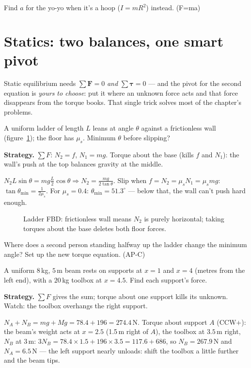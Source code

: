 \begin{exercise}[medium]
Find $a$ for the yo-yo when it's a hoop ($I=mR^{2}$) instead. (F=ma)
\end{exercise}

\section{Statics: two balances, one smart pivot}\label{sec:rot-static}

Static equilibrium needs $\sum\mathbf F=0$ \emph{and}
$\sum\boldsymbol\tau=0$ --- and the pivot for the second equation is
\emph{yours to choose}: put it where an unknown force acts and that force
disappears from the torque books. That single trick solves most of the
chapter's problems.

\begin{example}\label{ex:ladder}
A uniform ladder of length $L$ leans at angle $\theta$ against a
frictionless wall (figure~\ref{fig:ladder}); the floor has $\mu_s$.
Minimum $\theta$ before slipping?
\par\smallskip
\textbf{Strategy.} $\sum F$: $N_2=f$, $N_1=mg$. Torque about the base
(kills $f$ and $N_1$): the wall's push at the top balances gravity at the
middle.
\begin{solution}
$N_2 L\sin\theta=mg\frac{L}{2}\cos\theta \Rightarrow
N_2=\frac{mg}{2\tan\theta}$. Slip when $f=N_2=\mu_sN_1=\mu_smg$:
$\tan\theta_{\min}=\frac{1}{2\mu_s}$. For $\mu_s=0.4$: $\theta_{\min}=
51.3^{\circ}$ --- below that, the wall can't push hard enough. \checkmark
\end{solution}
\end{example}

\begin{figure}[htbp]\centering

\caption{Ladder FBD: frictionless wall means $N_2$ is purely horizontal;
taking torques about the base deletes both floor forces.}
\label{fig:ladder}
\end{figure}

\begin{exercise}[easy]
Where does a second person standing halfway up the ladder change the
minimum angle? Set up the new torque equation. (AP-C)
\end{exercise}

\begin{example}\label{ex:beam}
A uniform $8$\,kg, $5$\,m beam rests on supports at $x=1$ and $x=4$
(metres from the left end), with a $20$\,kg toolbox at $x=4.5$. Find each
support's force.
\par\smallskip
\textbf{Strategy.} $\sum F$ gives the sum; torque about one support kills
its unknown. Watch: the toolbox overhangs the right support.
\begin{solution}
$N_A+N_B=mg+Mg=78.4+196=274.4$\,N.
Torque about support $A$ (CCW$+$): the beam's weight acts at $x=2.5$
(1.5\,m right of $A$), the toolbox at $3.5$\,m right, $N_B$ at $3$\,m:
$3N_B=78.4\times1.5+196\times3.5=117.6+686$, so $N_B=267.9$\,N and
$N_A=6.5$\,N --- the left support nearly unloads: shift the toolbox a
little further and the beam tips. \checkmark
\end{solution}
\end{example}

